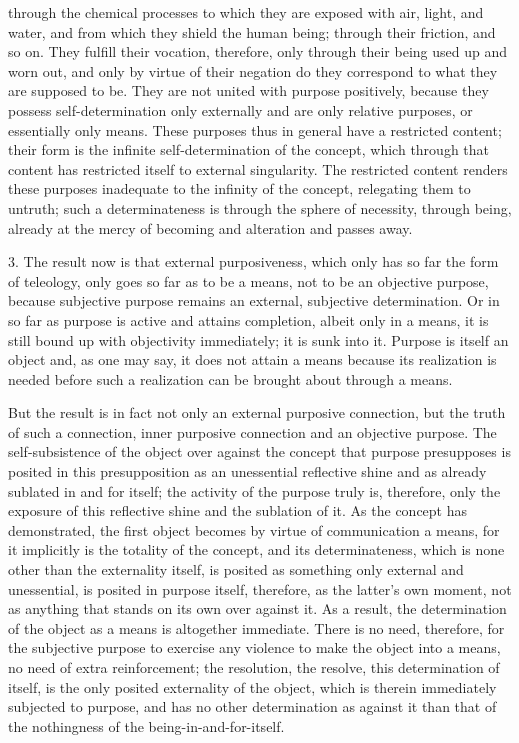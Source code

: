 through the chemical processes
to which they are exposed
with air, light, and water,
and from which they shield the human being;
through their friction, and so on.
They fulfill their vocation, therefore,
only through their being used up and worn out,
and only by virtue of their negation do
they correspond to what they are supposed to be.
They are not united with purpose positively,
because they possess self-determination only externally
and are only relative purposes,
or essentially only means.
These purposes thus in general have a restricted content;
their form is the infinite self-determination of the concept,
which through that content has restricted
itself to external singularity.
The restricted content renders
these purposes inadequate to
the infinity of the concept,
relegating them to untruth;
such a determinateness is
through the sphere of necessity,
through being, already at
the mercy of becoming
and alteration and passes away.

3. The result now is that external purposiveness,
which only has so far the form of teleology,
only goes so far as to be a means,
not to be an objective purpose,
because subjective purpose remains
an external, subjective determination.
Or in so far as purpose is
active and attains completion,
albeit only in a means,
it is still bound up
with objectivity immediately;
it is sunk into it.
Purpose is itself an object
and, as one may say,
it does not attain a means
because its realization is
needed before such a realization can be
brought about through a means.

But the result is in fact not only
an external purposive connection,
but the truth of such a connection,
inner purposive connection
and an objective purpose.
The self-subsistence of the object
over against the concept that
purpose presupposes is
posited in this presupposition
as an unessential reflective shine
and as already sublated in and for itself;
the activity of the purpose truly is,
therefore, only the exposure of
this reflective shine
and the sublation of it.
As the concept has demonstrated,
the first object becomes
by virtue of communication a means,
for it implicitly is the totality of the concept,
and its determinateness,
which is none other than the externality itself,
is posited as something only external and unessential,
is posited in purpose itself, therefore,
as the latter's own moment,
not as anything that stands
on its own over against it.
As a result, the determination of
the object as a means is
altogether immediate.
There is no need, therefore,
for the subjective purpose to exercise
any violence to make the object into a means,
no need of extra reinforcement;
the resolution, the resolve,
this determination of itself,
is the only posited externality of the object,
which is therein immediately subjected to purpose,
and has no other determination as
against it than that of the nothingness of
the being-in-and-for-itself.

